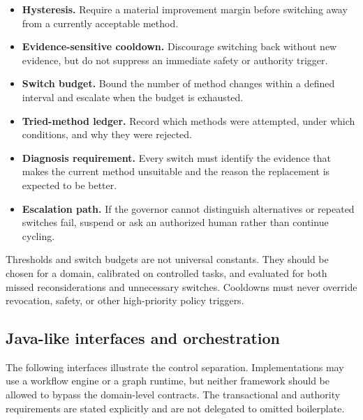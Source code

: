 \begin{itemize}
  \item \textbf{Hysteresis.} Require a material improvement margin before switching away from a currently acceptable method.
  \item \textbf{Evidence-sensitive cooldown.} Discourage switching back without new evidence, but do not suppress an immediate safety or authority trigger.
  \item \textbf{Switch budget.} Bound the number of method changes within a defined interval and escalate when the budget is exhausted.
  \item \textbf{Tried-method ledger.} Record which methods were attempted, under which conditions, and why they were rejected.
  \item \textbf{Diagnosis requirement.} Every switch must identify the evidence that makes the current method unsuitable and the reason the replacement is expected to be better.
  \item \textbf{Escalation path.} If the governor cannot distinguish alternatives or repeated switches fail, suspend or ask an authorized human rather than continue cycling.
\end{itemize}

Thresholds and switch budgets are not universal constants. They should be chosen for a domain, calibrated on controlled tasks, and evaluated for both missed reconsiderations and unnecessary switches. Cooldowns must never override revocation, safety, or other high-priority policy triggers.

\subsection{Java-like interfaces and orchestration}

The following interfaces illustrate the control separation. Implementations may use a workflow engine or a graph runtime, but neither framework should be allowed to bypass the domain-level contracts. The transactional and authority requirements are stated explicitly and are not delegated to omitted boilerplate.

